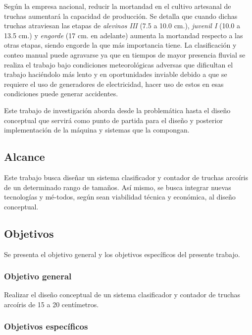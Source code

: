 Según la empresa nacional, reducir la mortandad en el cultivo artesanal de truchas aumentará la capacidad de producción. Se detalla que cuando dichas truchas atraviesan las etapas de \textit{alevinos III} (7.5 a 10.0 cm.), \textit{juvenil I} (10.0 a 13.5 cm.) y \textit{engorde} (17 cm. en adelante) aumenta la mortandad respecto a las otras etapas, siendo engorde la que más importancia tiene. La clasificación y conteo manual puede agravarse ya que en tiempos de mayor presencia fluvial se realiza el trabajo bajo condiciones meteorológicas adversas que dificultan el trabajo haciéndolo más lento y en oportunidades inviable debido a que se requiere el uso de generadores de electricidad, hacer uso de estos en esas condiciones puede generar accidentes. 

Este trabajo de investigación aborda desde la problemática hasta el diseño conceptual que servirá como punto de partida para el diseño y posterior implementación de la máquina y sistemas que la compongan.

\subsection{Alcance}

Este trabajo busca diseñar un sistema clasificador y contador de truchas arcoíris de un determinado rango de tamaños. Así mismo, se busca integrar nuevas tecnologías y mé-todos, según sean viabilidad técnica y económica, al diseño conceptual.

\subsection{Objetivos}

Se presenta el objetivo general y los objetivos específicos del presente trabajo.

\subsubsection{Objetivo general}

Realizar el diseño conceptual de un sistema clasificador y contador de truchas arcoíris de 15 a 20 centímetros.

\subsubsection{Objetivos específicos}

